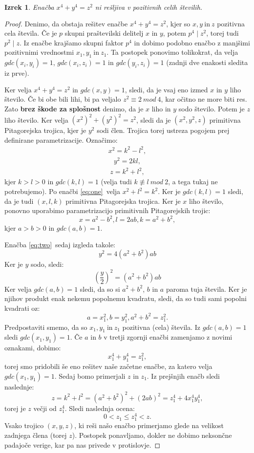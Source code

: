 \documentclass[a4paper, 10pt]{article}
\newtheorem{izr}{Izrek}
\begin{document}
\begin{izr}
\label{izr:fer}
Enačba $x^4 + y^4 = z^2$ ni rešljiva v pozitivnih celih številih.
\end{izr}

\begin{proof}
Denimo, da obstaja rešitev enačbe $x^4 + y^4 = z^2$, kjer so $x, y~\text{in}~z$ pozitivna cela števila.
Če je $p$ skupni praštevilski delitelj $x$ in $y$, potem $p^4 \mid z^2$, torej tudi $p^2 \mid z$. Iz enačbe krajšamo skupni faktor $p^4$ in dobimo podobno enačbo z manjšimi pozitivnimi vrednostmi $x_1, y_1~\text{in}~z_1$. Ta postopek ponovimo tolikokrat, da velja $gdc(x_i,y_i)=1$, $gdc(x_i,z_i)=1$ in $gdc(y_i,z_i)=1$ (zadnji dve enakosti sledita iz prve).

Ker velja $x^4 + y^4 = z^2$ in $gdc(x,y)=1$, sledi, da je vsaj eno izmed $x$ in $y$ liho število. Če bi obe bili lihi, bi pa veljalo $z^2 \equiv 2~mod~4$, kar očitno ne more biti res. Zato \textbf{brez škode za splošnost} denimo, da je $x$ liho in $y$ sodo število. Potem je $z$ liho število. Ker velja $(x^2)^2 + (y^2)^2 = z^2$, sledi da je $(x^2, y^2, z)$ primitivna Pitagorejska trojica, kjer je $y^2$ sodi člen. Trojica torej ustreza pogojem prej definirane parametrizacije.
Označimo:
\begin{align}
\label{eq:one}
x^2 = k^2 - l^2, 
\end{align}
\begin{align}
\label{eq:two}
y^2=2kl,
\end{align}
\begin{align}
\label{eq:three}
 z = k^2 + l^2,
\end{align}
kjer $k > l > 0$ in $gdc(k, l) = 1$ (velja tudi $k \not\equiv l~mod~2$, a tega tukaj ne potrebujemo). Po enačbi \ref{eq:one}~velja $x^2 + l^2 = k^2$. Ker je $gdc(k, l) = 1$ sledi, da je tudi $(x, l, k)$ primitivna Pitagorejska trojica. Ker je $x$ liho število, ponovno uporabimo parametrizacijo primitivnih Pitagorejskih trojic:
\[
x = a^2 - b^2, l=2ab, k = a^2 + b^2,
\] 
kjer $a > b > 0$ in $gdc(a, b) = 1$.

Enačba \ref{eq:two}~sedaj izgleda takole:
\[
y^2 = 4(a^2 + b^2)ab
\]
Ker je $y$ sodo, sledi:
\[
(\frac{y}{2})^2 = (a^2 + b^2)ab
\]
Ker velja $gdc(a, b) = 1$ sledi, da so si $a^2 + b^2$, $b$ in $a$ paroma tuja števila. Ker je njihov produkt enak nekemu popolnemu kvadratu, sledi, da so tudi sami popolni kvadrati oz:
\[
a = x_1^2, b = y_1^2, a^2 + b^2 = z_1^2.
\]
Predpostaviti smemo, da so $x_1, y_1~\text{in}~z_1$ pozitivna (cela) števila. Iz $gdc(a, b) = 1$ sledi $gdc(x_1, y_1) = 1$. Če $a$ in $b$ v tretji zgornji enačbi zamenjamo z novimi oznakami, dobimo:
\[
x_1^4 + y_1^4 = z_1^2,
\]
torej smo pridobili še eno rešitev naše začetne enačbe, za katero velja $gdc(x_1, y_1) = 1$. Sedaj bomo primerjali $z$ in $z_1$. Iz prejšnjih enačb sledi naslednje:
\[
z = k^2 + l^2 = (a^2 + b^2)^2 + (2ab)^2 = z_1^4 + 4x_1^4y_1^4,
\]
torej je $z$ večji od $z_1^4$.
Sledi naslednja ocena:
\[
0 < z_1 \leq z_1^4 < z.
\]
Vsako trojico $(x, y, z)$, ki reši našo enačbo primerjamo glede na velikost zadnjega člena (torej $z$). Postopek ponavljamo, dokler ne dobimo neksončne padajoče verige, kar pa nas privede v protislovje.
\end{proof}
\end{document}
